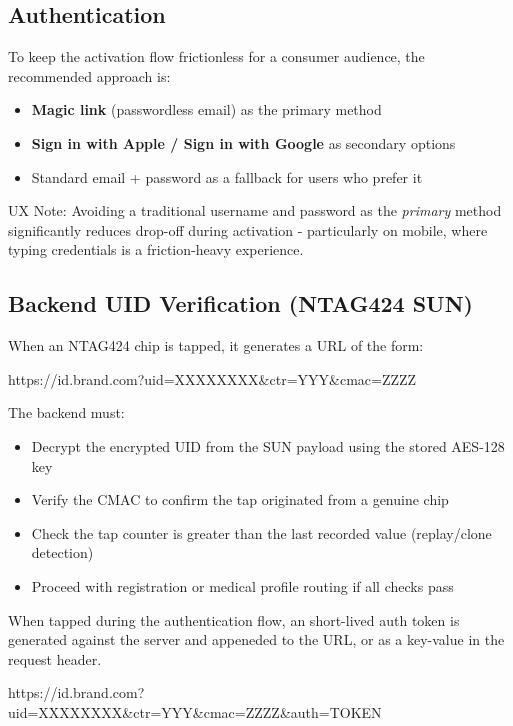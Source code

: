 \documentclass[
	a4paper, %
]{ChaosEngineReport}
\begin{document}
\subsection{Authentication}

To keep the activation flow frictionless for a consumer audience, the recommended approach is:

\begin{itemize}
  \item \textbf{Magic link} (passwordless email) as the primary method
  \item \textbf{Sign in with Apple / Sign in with Google} as secondary options
  \item Standard email + password as a fallback for users who prefer it
\end{itemize}

\begin{callout_box}{UX Note:}
  Avoiding a traditional username and password as the \textit{primary} method significantly reduces drop-off during activation - particularly on mobile, where typing credentials is a friction-heavy experience.
\end{callout_box}

\subsection{Backend UID Verification (NTAG424 SUN)}

When an NTAG424 chip is tapped, it generates a URL of the form:

\begin{center}
  \ttfamily\small https://id.brand.com?uid=XXXXXXXX\&ctr=YYY\&cmac=ZZZZ
\end{center}

The backend must:
\begin{itemize}
  \item Decrypt the encrypted UID from the SUN payload using the stored AES-128 key
  \item Verify the CMAC to confirm the tap originated from a genuine chip
  \item Check the tap counter is greater than the last recorded value (replay/clone detection)
  \item Proceed with registration or medical profile routing if all checks pass
\end{itemize}

When tapped during the authentication flow, an short-lived auth token is generated against the server and appeneded to the URL, or as a key-value in the request header.
\begin{center}
  \ttfamily\small https://id.brand.com?uid=XXXXXXXX\&ctr=YYY\&cmac=ZZZZ\&auth={TOKEN}
\end{center}
\end{document}
